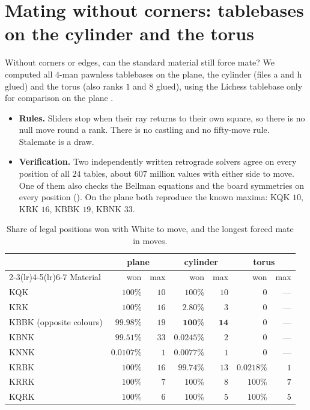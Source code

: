 \section{Mating without corners: tablebases on the cylinder and the torus}\label{sec:tablebases}

Without corners or edges, can the standard material still force mate? We computed all $4$-man pawnless
tablebases on the plane, the cylinder (files a and h glued) and the torus (also ranks $1$ and $8$ glued), using the Lichess tablebase only for comparison on the plane \citep{Lichess}.
\begin{itemize}
\item \textbf{Rules.} Sliders stop when their ray returns to their own square, so there is no null move round a
  rank. There is no castling and no fifty-move rule. Stalemate is a draw.
\item \textbf{Verification.} Two independently written retrograde solvers agree on every position of all $24$
  tables, about $607$ million values with either side to move. One of them also checks the Bellman equations
  and the board symmetries on every position (). On the plane both reproduce the known
  maxima: KQK $10$, KRK $16$, KBBK $19$, KBNK $33$.
\end{itemize}

\begin{table}[ht]
\centering\small
\begin{tabular}{@{}lrrrrrr@{}}
\toprule
& \multicolumn{2}{c}{plane} & \multicolumn{2}{c}{cylinder} & \multicolumn{2}{c}{torus} \\
\cmidrule(lr){2-3}\cmidrule(lr){4-5}\cmidrule(lr){6-7}
Material & won & max & won & max & won & max \\
\midrule
KQK & $100\%$ & $10$ & $100\%$ & $10$ & $0$ & --- \\
KRK & $100\%$ & $16$ & $\mathbf{2.80\%}$ & $3$ & $0$ & --- \\
KBBK (opposite colours) & $99.98\%$ & $19$ & $\mathbf{100\%}$ & $\mathbf{14}$ & $0$ & --- \\
KBNK & $99.51\%$ & $33$ & $\mathbf{0.0245\%}$ & $2$ & $0$ & --- \\
KNNK & $0.0107\%$ & $1$ & $0.0077\%$ & $1$ & $0$ & --- \\
KRBK & $100\%$ & $16$ & $99.74\%$ & $13$ & $0.0218\%$ & $1$ \\
KRRK & $100\%$ & $7$ & $100\%$ & $8$ & $100\%$ & $7$ \\
KQRK & $100\%$ & $6$ & $100\%$ & $5$ & $100\%$ & $5$ \\
\bottomrule
\end{tabular}
\caption{Share of legal positions won with White to move, and the longest forced mate in moves.}
\label{tab:tb}
\end{table}

